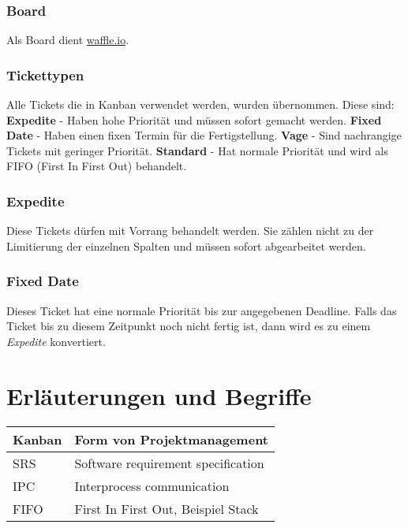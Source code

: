 \documentclass[a4paper]{book}
\begin{document}
\subsubsection{Board}
Als Board dient \href{https://waffle.io/chronos38/libipc-}{waffle.io}.

\subsubsection{Tickettypen}
Alle Tickets die in Kanban verwendet werden, wurden übernommen. Diese sind:\newline
\textbf{Expedite} - Haben hohe Priorität und müssen sofort gemacht werden.\newline
\textbf{Fixed Date} - Haben einen fixen Termin für die Fertigstellung.\newline
\textbf{Vage} - Sind nachrangige Tickets mit geringer Priorität.\newline
\textbf{Standard} - Hat normale Priorität und wird als FIFO (First In First Out) behandelt.

\subsubsection{Expedite}
Diese Tickets dürfen mit Vorrang behandelt werden. Sie zählen nicht zu der Limitierung der einzelnen Spalten und müssen sofort abgearbeitet werden.

\subsubsection{Fixed Date}
Dieses Ticket hat eine normale Priorität bis zur angegebenen Deadline. Falls das Ticket bis zu diesem Zeitpunkt noch nicht fertig ist, dann wird es zu einem \textit{Expedite} konvertiert.

\section{Erläuterungen und Begriffe}
\begin{center}
\begin{tabular}{|p{3cm}|p{8cm}|}
\hline
Kanban & Form von Projektmanagement \\
\hline
SRS & Software requirement specification \\
\hline
IPC & Interprocess communication \\
\hline
FIFO & First In First Out, Beispiel Stack \\
\hline
\end{tabular}
\end{center}
\end{document}
